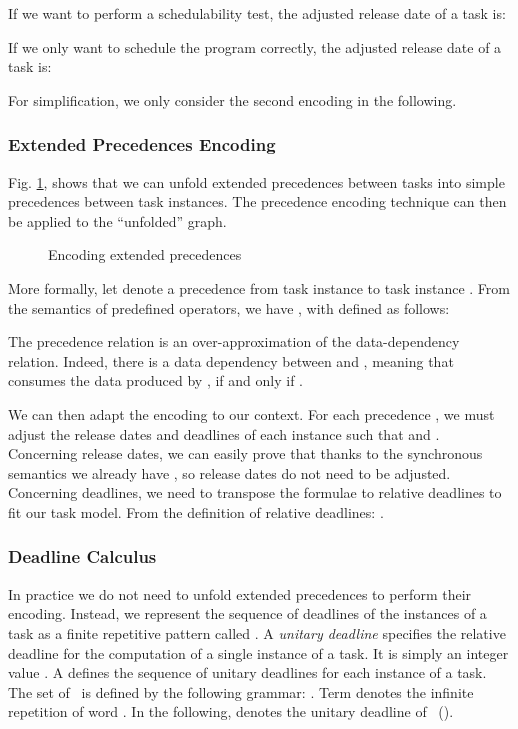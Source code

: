 If we want to perform a schedulability test, the adjusted release date of a task
is: 

 If we
only want to schedule the program correctly, the adjusted release date
of a task  is:

For simplification, we only
consider the second encoding in the following.

\subsubsection{Extended Precedences Encoding}
Fig. \ref{fig:multi-prec}, shows that we can unfold extended precedences
between tasks into simple precedences between task instances. The
precedence encoding technique can then be applied to
the ``unfolded'' graph.

\begin{figure}[hbt]
  \centering
  \hfill
  \hfill
  \hfill
  \caption{Encoding extended precedences}
  \label{fig:multi-prec}
\end{figure}

More formally, let  denote a precedence
from task instance  to task instance . From the
semantics of predefined operators, we have
, with  defined as follows:

The precedence relation is an over-approximation of the data-dependency
relation. Indeed, there is a data dependency between  and
, meaning that  consumes the data produced by
, if and only if .

We can then adapt the encoding to our context. For each precedence
, we must adjust the release dates and deadlines
of each instance  such that 
and . Concerning release dates, we
can easily prove that thanks to the synchronous semantics we already
have , so release dates do not need to be
adjusted. Concerning deadlines, we need to transpose the formulae to
relative deadlines to fit our task model. From the definition of
relative deadlines: .

\subsubsection{Deadline Calculus}
\label{sec:deadline-calculus}
In practice we do not need to unfold extended precedences to perform
their encoding. Instead, we represent the sequence of deadlines of the
instances of a task as a finite repetitive pattern called
\textit{\dword}. A \emph{unitary deadline} specifies the relative
deadline for the computation of a single instance of a task. It is
simply an integer value . A \emph{\dword} defines the sequence of
unitary deadlines for each instance of a task. The set of \dwords\ is
defined by the following grammar: . Term  denotes the infinite repetition of word . In the
following,  denotes the  unitary deadline of \dword\ 
().

